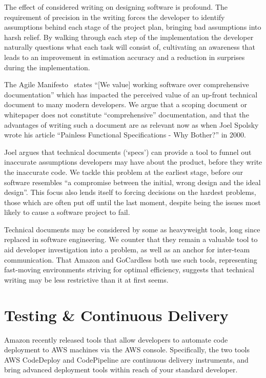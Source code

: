 \documentclass[11pt]{article}
\begin{document}
The effect of considered writing on designing software is profound. The
requirement of precision in the writing forces the developer to identify
assumptions behind each stage of the project plan, bringing bad assumptions into
harsh relief. By walking through each step of the implementation the developer
naturally questions what each task will consist of, cultivating an awareness
that leads to an improvement in estimation accuracy and a reduction in surprises
during the implementation.

The Agile Manifesto~\cite{agileManifesto} states “[We value] working software
over comprehensive documentation” which has impacted the perceived value of an
up-front technical document to many modern developers. We argue that a scoping
document or whitepaper does not constitute “comprehensive” documentation, and
that the advantages of writing such a document are as relevant now as when Joel
Spolsky wrote his article “Painless Functional Specifications - Why Bother?” in
2000.

Joel argues that technical documents (`specs') can provide a tool to funnel out
inaccurate assumptions developers may have about the product, before they write
the inaccurate code. We tackle this problem at the earliest stage, before our
software resembles “a compromise between the initial, wrong design and the ideal
design”. This focus also lends itself to forcing decisions on the hardest
problems, those which are often put off until the last moment, despite being the
issues most likely to cause a software project to fail.

Technical documents may be considered by some as heavyweight tools, long since
replaced in software engineering. We counter that they remain a valuable tool to
aid developer investigation into a problem, as well as an anchor for inter-team
communication. That Amazon and GoCardless both use such tools, representing
fast-moving environments striving for optimal efficiency, suggests that
technical writing may be less restrictive than it at first seems.

\section{Testing \& Continuous Delivery}

Amazon recently released tools that allow developers to automate code deployment
to AWS machines via the AWS console. Specifically, the two tools AWS CodeDeploy
and CodePipeline are continuous delivery instruments, and bring advanced
deployment tools within reach of your standard developer.
\end{document}
